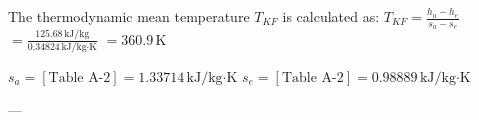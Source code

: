 The thermodynamic mean temperature \( T_{KF} \) is calculated as:  
\( T_{KF} = \frac{h_a - h_e}{s_a - s_e} \)  
\( = \frac{125.68 \, \text{kJ/kg}}{0.34824 \, \text{kJ/kg·K}} \)  
\( = 360.9 \, \text{K} \)  

\( s_a = [\text{Table A-2}] = 1.33714 \, \text{kJ/kg·K} \)  
\( s_e = [\text{Table A-2}] = 0.98889 \, \text{kJ/kg·K} \)  

---
